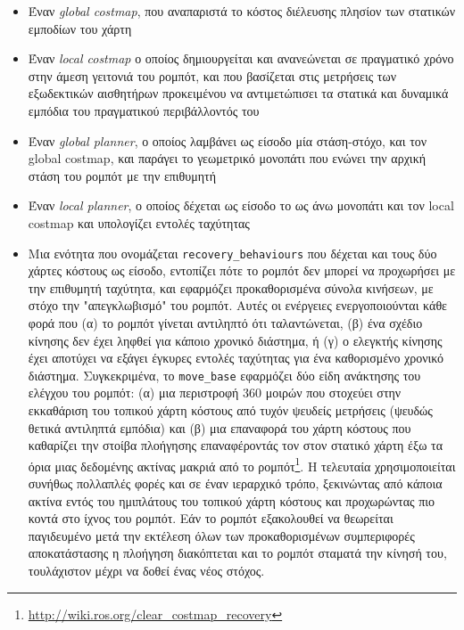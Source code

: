\begin{itemize}
  \item Έναν \textit{global costmap}, που αναπαριστά το κόστος διέλευσης πλησίον
        των στατικών εμποδίων του χάρτη
  \item Έναν \textit{local costmap} ο οποίος δημιουργείται και ανανεώνεται σε
        πραγματικό χρόνο στην άμεση γειτονιά του ρομπότ, και που βασίζεται στις
        μετρήσεις των εξωδεκτικών αισθητήρων προκειμένου να αντιμετώπισει τα
        στατικά και δυναμικά εμπόδια του πραγματικού περιβάλλοντός του
  \item Έναν \textit{global planner}, ο οποίος λαμβάνει ως είσοδο μία
        στάση-στόχο, και τον global costmap, και παράγει το γεωμετρικό μονοπάτι
        που ενώνει την αρχική στάση του ρομπότ με την επιθυμητή
  \item Έναν \textit{local planner}, ο οποίος δέχεται ως είσοδο το ως άνω
        μονοπάτι και τον local costmap και υπολογίζει εντολές ταχύτητας
  \item Μια ενότητα που ονομάζεται \texttt{recovery\_behaviours} που δέχεται και
        τους δύο χάρτες κόστους ως είσοδο, εντοπίζει πότε το ρομπότ δεν μπορεί
        να προχωρήσει με την επιθυμητή ταχύτητα, και εφαρμόζει προκαθορισμένα
        σύνολα κινήσεων, με στόχο την "απεγκλωβισμό" του ρομπότ. Αυτές οι
        ενέργειες ενεργοποιούνται κάθε φορά που (α) το ρομπότ γίνεται αντιληπτό
        ότι ταλαντώνεται, (β) ένα σχέδιο κίνησης δεν έχει ληφθεί για κάποιο
        χρονικό διάστημα, ή (γ) ο ελεγκτής κίνησης έχει αποτύχει να εξάγει
        έγκυρες εντολές ταχύτητας για ένα καθορισμένο χρονικό διάστημα.
        Συγκεκριμένα, το \texttt{move\_base} εφαρμόζει δύο είδη ανάκτησης του
        ελέγχου του ρομπότ: (α) μια περιστροφή $360$ μοιρών που στοχεύει στην
        εκκαθάριση του τοπικού χάρτη κόστους από τυχόν ψευδείς μετρήσεις
        (ψευδώς θετικά αντιληπτά εμπόδια) και (β) μια επαναφορά του χάρτη
        κόστους που καθαρίζει την στοίβα πλοήγησης επαναφέροντάς τον στον
        στατικό χάρτη έξω τα όρια μιας δεδομένης ακτίνας μακριά από το
        ρομπότ\footnote{\url{http://wiki.ros.org/clear\_costmap\_recovery}}.  Η
        τελευταία χρησιμοποιείται συνήθως πολλαπλές φορές και σε έναν ιεραρχικό
        τρόπο, ξεκινώντας από κάποια ακτίνα εντός του ημιπλάτους του τοπικού
        χάρτη κόστους και προχωρώντας πιο κοντά στο ίχνος του ρομπότ. Εάν το
        ρομπότ εξακολουθεί να θεωρείται παγιδευμένο μετά την εκτέλεση όλων των
        προκαθορισμένων συμπεριφορές αποκατάστασης η πλοήγηση διακόπτεται και
        το ρομπότ σταματά την κίνησή του, τουλάχιστον μέχρι να δοθεί ένας νέος
        στόχος.
\end{itemize}
